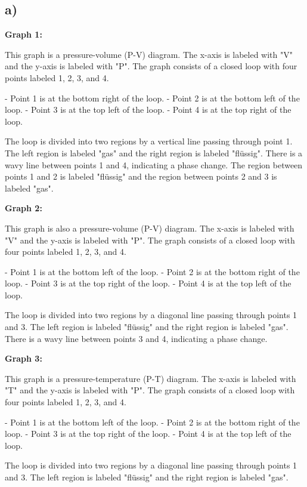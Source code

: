

\subsection*{a)}

\textbf{Graph 1:}

This graph is a pressure-volume (P-V) diagram. The x-axis is labeled with "V" and the y-axis is labeled with "P". The graph consists of a closed loop with four points labeled 1, 2, 3, and 4. 

- Point 1 is at the bottom right of the loop.
- Point 2 is at the bottom left of the loop.
- Point 3 is at the top left of the loop.
- Point 4 is at the top right of the loop.

The loop is divided into two regions by a vertical line passing through point 1. The left region is labeled "gas" and the right region is labeled "flüssig". There is a wavy line between points 1 and 4, indicating a phase change. The region between points 1 and 2 is labeled "flüssig" and the region between points 2 and 3 is labeled "gas".

\textbf{Graph 2:}

This graph is also a pressure-volume (P-V) diagram. The x-axis is labeled with "V" and the y-axis is labeled with "P". The graph consists of a closed loop with four points labeled 1, 2, 3, and 4.

- Point 1 is at the bottom left of the loop.
- Point 2 is at the bottom right of the loop.
- Point 3 is at the top right of the loop.
- Point 4 is at the top left of the loop.

The loop is divided into two regions by a diagonal line passing through points 1 and 3. The left region is labeled "flüssig" and the right region is labeled "gas". There is a wavy line between points 3 and 4, indicating a phase change.

\textbf{Graph 3:}

This graph is a pressure-temperature (P-T) diagram. The x-axis is labeled with "T" and the y-axis is labeled with "P". The graph consists of a closed loop with four points labeled 1, 2, 3, and 4.

- Point 1 is at the bottom left of the loop.
- Point 2 is at the bottom right of the loop.
- Point 3 is at the top right of the loop.
- Point 4 is at the top left of the loop.

The loop is divided into two regions by a diagonal line passing through points 1 and 3. The left region is labeled "flüssig" and the right region is labeled "gas".



